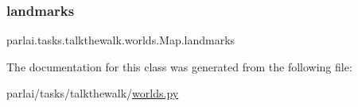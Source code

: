 \mbox{\label{classparlai_1_1tasks_1_1talkthewalk_1_1worlds_1_1Map_a11ed4a0cac5c44b1a61dc702378e5b9f}} 
\subsubsection{\texorpdfstring{landmarks}{landmarks}}
{\footnotesize\ttfamily parlai.\+tasks.\+talkthewalk.\+worlds.\+Map.\+landmarks}



The documentation for this class was generated from the following file\+:\begin{DoxyCompactItemize}
\item 
parlai/tasks/talkthewalk/\hyperlink{parlai_2tasks_2talkthewalk_2worlds_8py}{worlds.\+py}\end{DoxyCompactItemize}
